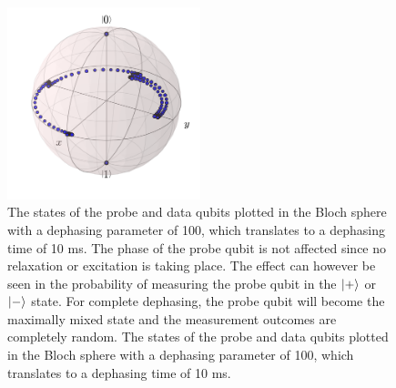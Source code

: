 \begin{figure}[H]
	\caption[oddeven]{}
	\label{FIG:deph}
\end{figure}


\begin{figure}[h]
  \centering
    \includegraphics[width=0.5\textwidth]{../Figures/Circ_orbit_odd_100_dephasing.png}
      \caption{The states of the probe and data qubits plotted in the Bloch sphere with a dephasing parameter of 100, which translates to a dephasing time of 10 ms. The phase of the probe qubit is not affected since no relaxation or excitation is taking place. The effect can however be seen in the probability of measuring the probe qubit in the $\ket{+}$ or $\ket{-}$ state. For complete dephasing, the probe qubit will become the maximally mixed state and the measurement outcomes are completely random. The states of the probe and data qubits plotted in the Bloch sphere with a dephasing parameter of 100, which translates to a dephasing time of 10 ms.}
      \label{fig:BlochsphereDephasing}
      
\end{figure}


